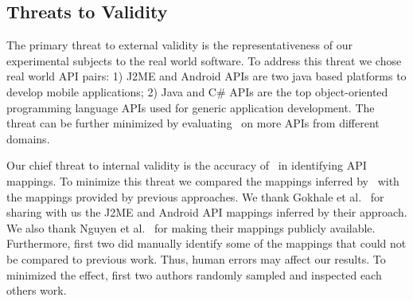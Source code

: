  

\subsection{Threats to Validity}
\label{sub:threats}

The primary threat to external validity is the representativeness of our experimental subjects to the real world software. To address this threat we chose real world API pairs: 1) J2ME and Android APIs are two java based platforms to develop mobile applications; 2) Java and C\# APIs are the top object-oriented programming language APIs used for generic application development. The threat can be further minimized by evaluating \tool\ on more APIs from different domains. 

Our chief threat to internal validity is the accuracy of \tool\ in identifying API mappings. 
To minimize this threat we compared the mappings inferred by \tool\ with
the mappings provided by previous approaches. We thank Gokhale et al.~\cite{Gokhale2013ICSE} for sharing with us the J2ME and Android API mappings inferred by their approach. We also thank Nguyen et al.~\cite{nguyen2014statistical} for making their mappings publicly available. Furthermore, first two did manually identify some of the mappings that could not be compared to previous work. Thus, human errors may affect our results. To minimized the effect, first two authors randomly sampled and inspected each others work. 